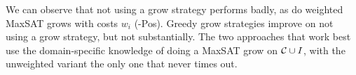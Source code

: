 We can observe that not using a grow strategy performs badly, as do weighted MaxSAT grows with costs $w_i$ (-Pos). Greedy grow strategies improve on not using a grow strategy, but not substantially. The two approaches that work best use the domain-specific knowledge of doing a MaxSAT grow on $\mathcal{C} \cup I$, with the unweighted variant the only one that never times out.

